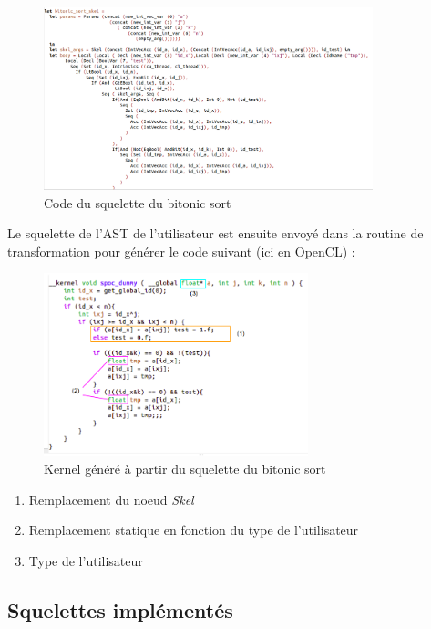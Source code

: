 \documentclass{report}
\begin{document}
\begin{figure}[!h]
\begin{center}
\includegraphics[height=150pt]{images_finales/skel_sort.png}
\end{center}
\caption{Code du squelette du bitonic sort}
\label{test7}
\end{figure}

\newpage
Le squelette de l'AST de l'utilisateur est ensuite envoyé dans la routine de transformation pour générer le code suivant (ici en OpenCL) : \newline

\begin{figure}[!h]
\begin{center}
\includegraphics[height=150pt]{images_finales/kernel_sort.png}
\end{center}
\caption{Kernel généré à partir du squelette du bitonic sort}
\label{test8}
\end{figure}


\begin{enumerate}
\item Remplacement du noeud \textit{Skel}
\item Remplacement statique en fonction du type de l'utilisateur
\item Type de l'utilisateur
\end{enumerate}
\newpage
\subsection{Squelettes implémentés}
\end{document}
